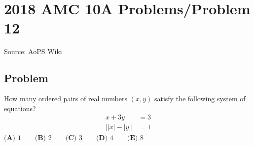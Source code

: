 \documentclass[12pt]{article}
\begin{document}
\section*{{2018 AMC 10A Problems/Problem 12}}
Source: AoPS Wiki

\subsection*{Problem}
How many ordered pairs of real numbers $(x,y)$ satisfy the following system of equations? \begin{align*} x+3y&=3 \\ \big||x|-|y|\big|&=1 \end{align*} $\textbf{(A) } 1 \qquad \textbf{(B) } 2 \qquad \textbf{(C) } 3 \qquad \textbf{(D) } 4 \qquad \textbf{(E) } 8$
\end{document}
